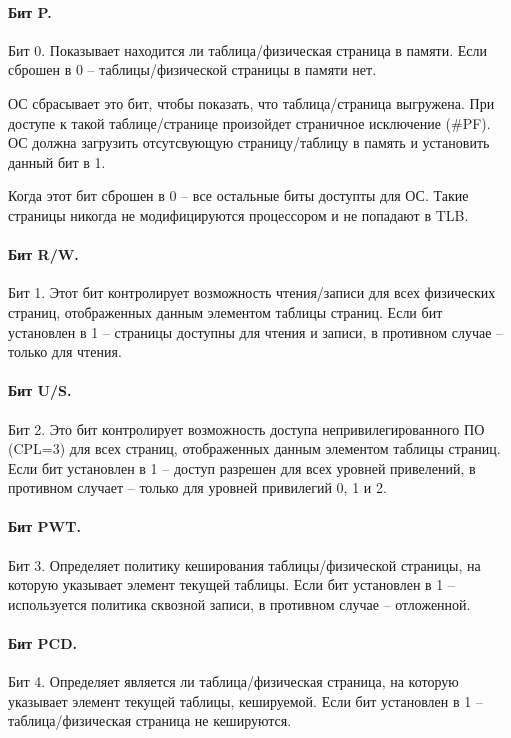\paragraph{Бит P.} Бит 0. Показывает находится ли таблица/физическая страница в памяти. Если сброшен в 0 --
таблицы/физической страницы в памяти нет.

ОС сбрасывает это бит, чтобы показать, что таблица/страница выгружена. При доступе к такой таблице/странице произойдет страничное
исключение (\#PF). ОС должна загрузить отсутсвующую страницу/таблицу в память и установить данный бит в 1.

Когда этот бит сброшен в 0 -- все остальные биты доступты для ОС. Такие страницы никогда не модифицируются процессором и
не попадают в TLB.

\paragraph{Бит R/W.} Бит 1. Этот бит контролирует возможность чтения/записи для всех физических страниц, отображенных
данным элементом таблицы страниц. Если бит установлен в 1 -- страницы доступны для чтения и записи, в противном случае --
только для чтения.

\paragraph{Бит U/S.} Бит 2. Это бит контролирует возможность доступа непривилегированного ПО (CPL=3) для всех страниц,
отображенных данным элементом таблицы страниц. Если бит установлен в 1 -- доступ разрешен для всех уровней привелений,
в противном случает -- только для уровней привилегий 0, 1 и 2.

\paragraph{Бит PWT.} Бит 3. Определяет политику кеширования таблицы/физической страницы, на которую указывает
элемент текущей таблицы. Если бит установлен в 1 -- используется политика сквозной записи, в противном случае -- отложенной.

\paragraph{Бит PCD.} Бит 4. Определяет является ли таблица/физическая страница, на которую указывает элемент
текущей таблицы, кешируемой. Если бит установлен в 1 -- таблица/физическая страница не кешируются.

